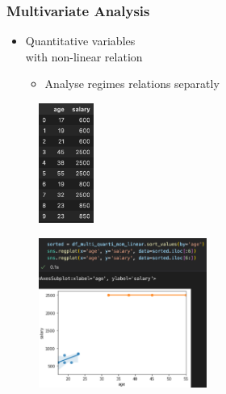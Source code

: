 \begin{frame}\frametitle{Multivariate Analysis}
   \begin{minipage}{0.48\linewidth}
      \begin{itemize}
         \item Quantitative variables\\
               with non-linear relation
         \begin{itemize}
            \item Analyse regimes relations separatly
         \end{itemize}
      \end{itemize}
      \begin{figure}[H]
         \includegraphics[width=1.8cm]{../images/illustrations/pattern_multivariate_quantitative_non_linear_df.png}
      \end{figure}
   \end{minipage}
   \begin{minipage}{0.48\linewidth}
      \begin{figure}[H]
         \includegraphics[width=5.5cm]{../images/illustrations/pattern_multivariate_quantitative_non_linear_regressions.png}
      \end{figure}
   \end{minipage}
\end{frame}


